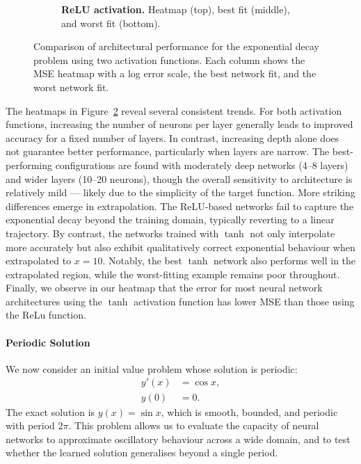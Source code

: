 \begin{figure}[ht]
\begin{subfigure}[t]{0.48\textwidth}
        \caption{\textbf{ReLU activation.} Heatmap (top), best fit (middle), and worst fit (bottom).}
        \label{fig:expdecay_relu_column}
    \end{subfigure}
    \hspace*{\fill}
    \caption{Comparison of architectural performance for the exponential decay problem using two 
    activation functions. Each column shows the MSE heatmap with a log error scale,
    the best network fit, and the worst network fit.}
    \label{fig:expdecay_sidebyside}
\end{figure}


The heatmaps in Figure~\ref{fig:expdecay_sidebyside} reveal several consistent trends. For 
both activation functions, increasing the number of neurons per layer generally leads to improved 
accuracy for a fixed number of layers. In contrast, increasing depth alone does not guarantee better 
performance, particularly when layers are narrow. The best-performing configurations are found with 
moderately deep networks (4--8 layers) and wider layers (10--20 neurons), though the overall 
sensitivity to architecture is relatively mild — likely due to the simplicity of the target 
function. More striking differences emerge in extrapolation. The ReLU-based networks fail to 
capture the exponential decay beyond the training domain, typically reverting to a linear 
trajectory. By contrast, the networks trained with \(\tanh\) not only interpolate more accurately 
but also exhibit qualitatively correct exponential behaviour when extrapolated to \(x = 10\).
Notably, the best \(\tanh\) network also performs well in the extrapolated region, while the 
worst-fitting example remains poor throughout. Finally, we observe in our heatmap that the 
error for most neural network architectures using the $\tanh$ activation function has lower MSE 
than those using the ReLu function. 



\paragraph{Periodic Solution}

We now consider an initial value problem whose solution is periodic:
\[
\begin{aligned}
    y'(x) &= \cos x, \\
    y(0) &= 0.
\end{aligned}
\]
The exact solution is \( y(x) = \sin x \), which is smooth, bounded, and periodic with period \( 2\pi \).  
This problem allows us to evaluate the capacity of neural networks to approximate oscillatory behaviour
across a wide domain, and to test whether the learned solution generalises beyond a single period.

